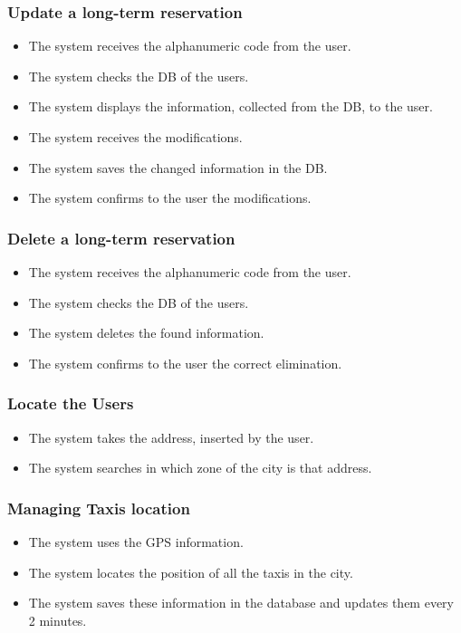 		\subsubsection{Update a long-term reservation}
		\begin{itemize}
			\item The system receives the alphanumeric code from the user.
			\item The system checks the DB of the users.
			\item The system displays the information, collected from the DB, to the user.
			\item The system receives the modifications.
			\item The system saves the changed information in the DB.
			\item The system confirms to the user the modifications.
		\end{itemize}
		\subsubsection{Delete a long-term reservation}
		\begin{itemize}
			\item The system receives the alphanumeric code from the user.
			\item The system checks the DB of the users.
			\item The system deletes the found information.
			\item The system confirms to the user the correct elimination.
		\end{itemize}
		\subsubsection{Locate the Users}
		\begin{itemize}
			\item The system takes the address, inserted by the user.
			\item The system searches in which zone of the city is that address.
		\end{itemize}		
		\subsubsection{Managing Taxis location}
		\begin{itemize}
			\item The system uses the GPS information.
			\item The system locates the position of all the taxis in the city.
			\item The system saves these information in the database and updates them every 2 minutes.
		\end{itemize}
